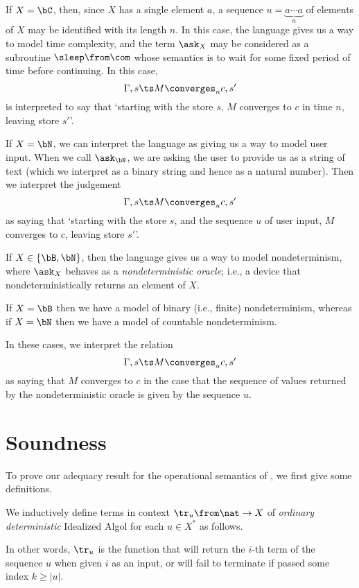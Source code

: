 \begin{example}
  If $X=\bC$, then, since $X$ has a single element $a$, a sequence $u=\underbrace{a\cdots a}_n$ of elements of $X$ may be identified with its length $n$.
  In this case, the language \IAX gives us a way to model time complexity, and the term $\ask_X$ may be considered as a subroutine $\sleep\from \com$ whose semantics is to wait for some fixed period of time before continuing.  
  In this case, 
  \[
    \Gamma,s\ts M \converges_n c,s'
    \]
  is interpreted to say that `starting with the store $s$, $M$ converges to $c$ in time $n$, leaving store $s'$'.
\end{example}
\begin{example}
  If $X=\bN$, we can interpret the language \IAX as giving us a way to model user input.  
  When we call $\ask_\bN$, we are asking the user to provide us as a string of text (which we interpret as a binary string and hence as a natural number).  
  Then we interpret the judgement
  \[
    \Gamma,s\ts M \converges_u c,s'
    \]
  as saying that `starting with the store $s$, and the sequence $u$ of user input, $M$ converges to $c$, leaving store $s'$'.
\end{example}
\begin{example}
  If $X\in\{\bB,\bN\}$, then the language \IAX gives us a way to model nondeterminism, where $\ask_X$ behaves as a \emph{nondeterministic oracle}; i.e., a device that nondeterministically returns an element of $X$.

  If $X=\bB$ then we have a model of binary (i.e., finite) nondeterminism, whereas if $X=\bN$ then we have a model of countable nondeterminism.

  In these cases, we interpret the relation
  \[
    \Gamma,s\ts M \converges_u c,s'
    \]
  as saying that $M$ converges to $c$ in the case that the sequence of values returned by the nondeterministic oracle is given by the sequence $u$.
\end{example}

\section{Soundness}
\label{SecSoundness}

To prove our adequacy result for the operational semantics of \IAX, we first give some definitions.

\begin{definition}
  We inductively define terms in context $\tr_u\from \nat \to X$ of \emph{ordinary deterministic} Idealized Algol for each $u\in X^*$ as follows.
\end{definition}
In other words, $\tr_u$ is the function that will return the $i$-th term of the sequence $u$ when given $i$ as an input, or will fail to terminate if passed some index $k\ge|u|$.

